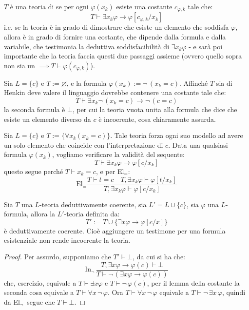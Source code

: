 \begin{definition}
    $T$ è una teoria di  se per ogni $\varphi(x_k)$ esiste una costante $c_{\varphi,k}$ tale che:
    \[ T \vdash \exists x_k \varphi \to \varphi[c_{\varphi,k}/x_k]\]
    i.e. se la teoria è in grado di dimostrare che esiste un elemento che soddisfa $\varphi$, allora è in grado di fornire una costante, che dipende dalla formula e dalla variabile, che testimonia la deduttiva soddisfacibilità di $\exists x_k\varphi$ - e sarà poi importante che la teoria faccia questi due passaggi assieme (ovvero quello sopra non sia un $\implies T \vdash \varphi(c_{\varphi,k})$).
\end{definition}

\begin{example}
    Sia $L = \{c\}$ e $T := \varnothing$, e la formula $\varphi(x_k) := \neg \,(x_k = c)$. Affinché $T$ sia di Henkin deve valere il linguaggio dovrebbe contenere una costante tale che:
    \[ T \vdash \exists x_k \neg \,(x_k = c) \to \neg \,(c = c) \]
    la seconda formula è $\bot$, per cui la teoria vuota unita alla formula che dice che esiste un elemento diverso da $c$ è incoerente, cosa chiaramente assurda.
\end{example}

\begin{example}
    Sia $L = \{c\}$ e $T := \{\forall x_k (x_k = c)\}$. Tale teoria forza ogni suo modello ad avere un solo elemento che coincide con l'interpretazione di $c$.
    Data una qualsiasi formula $\varphi(x_k)$, vogliamo verificare la validità del sequente:
    \[ T \vdash \exists x_k \varphi \to \varphi[c/x_k] \]
    questo segue perché $T \vdash x_k = c$, e per El$_=$:
    \[ \mathrm{El}_=\frac{T \vdash t = c \quad T,\exists x_k \varphi \vdash \varphi[t/x_k]}{T, \exists x_k \varphi \vdash \varphi[c/x_k]} \]
\end{example}

\begin{lemma}
    Sia $T$ una $L$-teoria deduttivamente coerente, sia $L' = L \cup \{c\}$, sia $\varphi$ una $L$-formula, allora la $L'$-teoria definita da:
    \[ T' := T \cup \{\exists x \varphi \to \varphi[c/x]\} \]
    è deduttivamente coerente. Cioè aggiungere un testimone per una formula esistenziale non rende incoerente la teoria.
\end{lemma}

\begin{proof}
    Per assurdo, supponiamo che $T' \vdash \bot$, da cui si ha che:
    \[ \text{In}_\neg \, \frac{T,\exists x \varphi \to \varphi(c) \vdash \bot}{T \vdash \neg \,(\exists x \varphi \to \varphi(c))} \]
    che, esercizio, equivale a $T \vdash \exists x \varphi$ e $T \vdash \neg \,\varphi(c)$, per il lemma della costante la seconda cosa equivale a $T \vdash \forall x \, \neg \,\varphi$.
    Ora $T \vdash \forall x \, \neg \,\varphi$ equivale a $T \vdash \neg \, \exists x \, \varphi$, quindi da El$_\neg \,$ segue che $T \vdash \bot$.
\end{proof}

